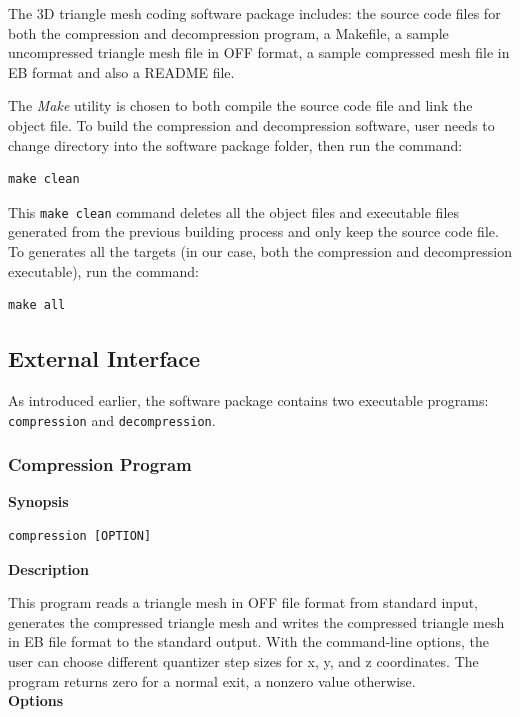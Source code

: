 \documentclass[onecolumn, 12pt]{article}
\begin{document}
The 3D triangle mesh coding software package includes: the source code files for both the compression and decompression program, a Makefile, a sample uncompressed triangle mesh file in OFF format, a sample compressed mesh file in EB format and also a README file.

The \emph{Make} utility is chosen to both compile the source code file and link the object file. To build the compression and decompression software, user needs to change directory into the software package folder, then run the command:
\begin{lstlisting}
make clean
\end{lstlisting}

This \lstinline{make clean} command deletes all the object files and executable files generated from the previous building process and only keep the source code file. To generates all the targets (in our case, both the compression and decompression executable), run the command:
\begin{lstlisting}
make all
\end{lstlisting}


\subsection{External Interface}
As introduced earlier, the software package contains two executable programs: \lstinline{compression} and \lstinline{decompression}.

\subsubsection{Compression Program}
\textbf{Synopsis}
\begin{lstlisting}
compression [OPTION]
\end{lstlisting}


{\setlength\parindent{0pt}
\textbf{Description}\vspace{0.5em}}

This program reads a triangle mesh in OFF file format from standard input, generates the compressed triangle mesh and writes the compressed triangle mesh in EB file format to the standard output. With the command-line options, the user can choose different quantizer step sizes for x, y, and z coordinates. The program returns zero for a normal exit, a nonzero value otherwise.\\


{\setlength\parindent{0pt}
\textbf{Options}\vspace{0.5em}}
\end{document}
